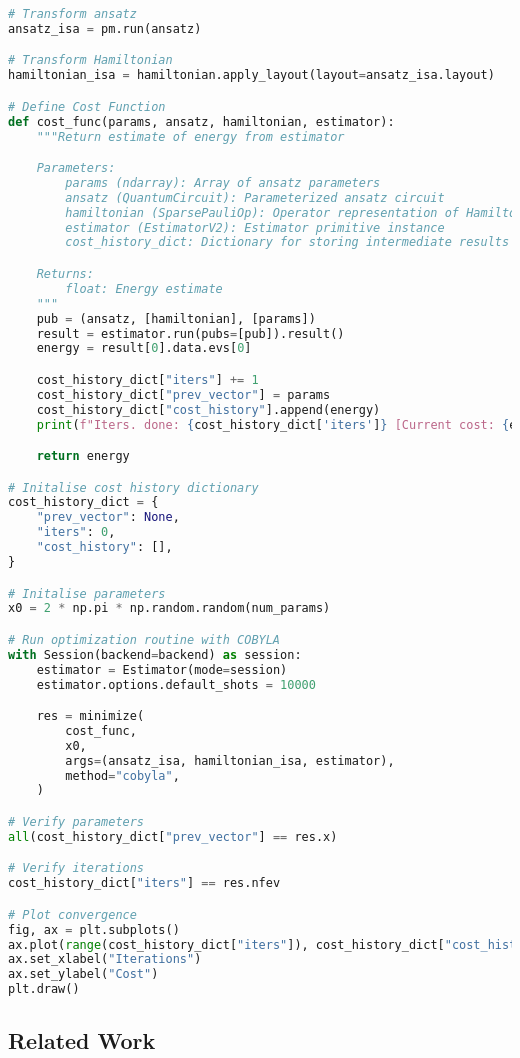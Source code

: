 \documentclass{article}
\begin{document}
{\begin{lstlisting}[language=Python]
# Transform ansatz
ansatz_isa = pm.run(ansatz)

# Transform Hamiltonian
hamiltonian_isa = hamiltonian.apply_layout(layout=ansatz_isa.layout)

# Define Cost Function
def cost_func(params, ansatz, hamiltonian, estimator):
    """Return estimate of energy from estimator

    Parameters:
        params (ndarray): Array of ansatz parameters
        ansatz (QuantumCircuit): Parameterized ansatz circuit
        hamiltonian (SparsePauliOp): Operator representation of Hamiltonian
        estimator (EstimatorV2): Estimator primitive instance
        cost_history_dict: Dictionary for storing intermediate results

    Returns:
        float: Energy estimate
    """
    pub = (ansatz, [hamiltonian], [params])
    result = estimator.run(pubs=[pub]).result()
    energy = result[0].data.evs[0]

    cost_history_dict["iters"] += 1
    cost_history_dict["prev_vector"] = params
    cost_history_dict["cost_history"].append(energy)
    print(f"Iters. done: {cost_history_dict['iters']} [Current cost: {energy}]")

    return energy

# Initalise cost history dictionary
cost_history_dict = {
    "prev_vector": None,
    "iters": 0,
    "cost_history": [],
}

# Initalise parameters
x0 = 2 * np.pi * np.random.random(num_params)

# Run optimization routine with COBYLA
with Session(backend=backend) as session:
    estimator = Estimator(mode=session)
    estimator.options.default_shots = 10000

    res = minimize(
        cost_func,
        x0,
        args=(ansatz_isa, hamiltonian_isa, estimator),
        method="cobyla",
    )

# Verify parameters
all(cost_history_dict["prev_vector"] == res.x)

# Verify iterations
cost_history_dict["iters"] == res.nfev

# Plot convergence
fig, ax = plt.subplots()
ax.plot(range(cost_history_dict["iters"]), cost_history_dict["cost_history"])
ax.set_xlabel("Iterations")
ax.set_ylabel("Cost")
plt.draw()

\end{lstlisting}


\subsection{Related Work}

}
\end{document}
